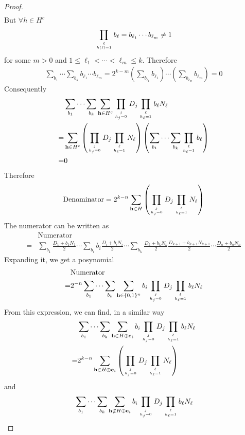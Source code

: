 \documentclass[12pt]{article}
\newcommand{\vect}[1]{\mathbf{#1}}
\begin{document}
\begin{proof}
\begin{align}
\end{align}
But $\forall h \in H^c$
\begin{align}
\prod_{\ell\atop h(\ell) = 1}b_\ell =b_{\ell_1}\cdots b_{\ell_m}\neq 1
\end{align}
for some $m>0$ and $1\le \ell_1 < \cdots < \ell_m\le k$. Therefore
\begin{align}
\sum_{b_1}\cdots\sum_{b_k}b_{\ell_1}\cdots b_{\ell_m} = 2^{k-m}\left(\sum_{b_{\ell_1}}b_{\ell_1}\right)\cdots\left(\sum_{b_{\ell_m}}b_{\ell_m}\right)=0
\end{align}
Consequently
\begin{align}
&\sum_{b_1}\cdots\sum_{b_k}\sum_{\vect{h}\in H^c}\prod_{j\atop h_j = 0}D_j\prod_{\ell\atop h_\ell = 1}b_\ell N_\ell\\
=&\sum_{\vect{h}\in H^c}\left(\prod_{j\atop h_j = 0}D_j\prod_{\ell\atop h_\ell = 1} N_\ell\right)\left(\sum_{b_1}\cdots\sum_{b_k}\prod_{\ell\atop h_\ell=1}b_\ell\right)\\
=&0
\end{align}
Therefore
\begin{align}
\text{Denominator}=2^{k-n}\sum_{\vect{h}\in H}\left(\prod_{j\atop h_j = 0}D_j\prod_{\ell\atop h_\ell = 1} N_\ell\right)
\end{align}
The numerator can be written as
\begin{align}
&\text{Numerator}\\
=&\sum_{b_1}\frac{D_1+b_1N_1}{2}\cdots\sum_{b_i}b_i\frac{D_i+b_iN_i}{2}\cdots\sum_{b_k}\frac{D_k+b_kN_k}{2}\frac{D_{k+1}+b_{k+1}N_{k+1}}{2}\cdots\frac{D_n+b_nN_n}{2}
\end{align}
Expanding it, we get a posynomial
\begin{align}
&\text{Numerator}\\
=&2^{-n}\sum_{b_1}\cdots\sum_{b_k}\sum_{\vect{h}\in \{0,1\}^n}b_i\prod_{j\atop h_j = 0}D_j\prod_{\ell\atop h_\ell = 1}b_\ell N_\ell
\end{align}
From this expression, we can find, in a similar way
\begin{align}
&\sum_{b_1}\cdots\sum_{b_k}\sum_{\vect{h}\in H\oplus \vect{e}_i}b_i\prod_{j\atop h_j = 0}D_j\prod_{\ell\atop h_\ell = 1}b_\ell N_\ell\\
=&2^{k-n}\sum_{\vect{h}\in H\oplus \vect{e}_i}\left(\prod_{j\atop h_j = 0}D_j\prod_{\ell\atop h_\ell = 1} N_\ell\right)
\end{align}
and
\begin{align}
&\sum_{b_1}\cdots\sum_{b_k}\sum_{\vect{h}\not\in H\oplus\vect{e}_i}b_i\prod_{j\atop h_j = 0}D_j\prod_{\ell\atop h_\ell = 1}b_\ell N_\ell\\

\end{align}
\end{proof}
\end{document}
